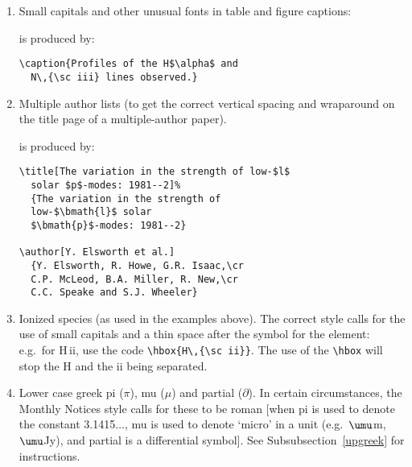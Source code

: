 \begin{enumerate}

\item Small capitals and other unusual fonts in table and figure captions:
\par\smallskip
{}
%
is produced by:
%
\begin{verbatim}
\caption{Profiles of the H$\alpha$ and
  N\,{\sc iii} lines observed.}
\end{verbatim}
        
\item Multiple author lists (to get the correct vertical spacing 
and wraparound on the title page of a multiple-author paper).
\par\smallskip

%
is produced by:
%
\begin{verbatim}      
\title[The variation in the strength of low-$l$ 
  solar $p$-modes: 1981--2]%
  {The variation in the strength of 
  low-$\bmath{l}$ solar 
  $\bmath{p}$-modes: 1981--2}
        
\author[Y. Elsworth et al.]
  {Y. Elsworth, R. Howe, G.R. Isaac,\cr 
  C.P. McLeod, B.A. Miller, R. New,\cr 
  C.C. Speake and S.J. Wheeler}
\end{verbatim}        
        
\item Ionized species (as used in the examples above). The correct 
style calls for the use of small capitals and a thin space after 
the symbol for the element: e.g.\ for \hbox{H\,{\sc ii}}, use the code 
\verb"\hbox{H\,{\sc ii}}". The use of the \verb"\hbox" will stop the 
H and the {\sc ii} being separated.

\item Lower case greek pi ($\pi$), mu ($\mu$) and partial ($\partial$).
In certain circumstances, the Monthly Notices style calls for these to be
roman [when pi is used to denote the constant 3.1415$\ldots$, mu is
used to denote `micro' in a unit (e.g.\ $\umu$m, $\umu$Jy), and partial
is a differential symbol]. See Subsubsection~\ref{upgreek} for instructions.


\end{enumerate}
